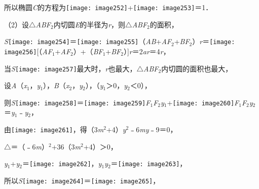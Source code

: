 \documentclass[a4paper,11pt,UTF8,twoside]{ctexart} %
\begin{document}
所以椭圆\textit{C}的方程为\texttt{[image: image252]}+\texttt{[image: image253]}＝1．

（2）设$\mathrm{\triangle}$\textit{ABF}${}_{2}$内切圆\textit{E}的半径为\textit{r}，则$\mathrm{\triangle}$\textit{ABF}${}_{2}$的面积，

\textit{S}\texttt{[image: image254]}＝\texttt{[image: image255]}（{\textbar}\textit{AB}{\textbar}+{\textbar}\textit{AF}${}_{2}${\textbar}+{\textbar}\textit{BF}${}_{2}${\textbar}）\textit{r}＝\texttt{[image: image256]}[（{\textbar}\textit{AF}${}_{1}${\textbar}+{\textbar}\textit{AF}${}_{2}${\textbar}）+（{\textbar}\textit{BF}${}_{1}${\textbar}+{\textbar}\textit{BF}${}_{2}${\textbar}）]\textit{r}＝2\textit{ar}＝4\textit{r}，

当\textit{S}\texttt{[image: image257]}最大时，\textit{r}也最大，$\mathrm{\triangle}$\textit{ABF}${}_{2}$内切圆的面积也最大，

设\textit{A}（\textit{x}${}_{1}$，\textit{y}${}_{1}$），\textit{B}（\textit{x}${}_{2}$，\textit{y}${}_{2}$），（\textit{y}${}_{1}$＞0，\textit{y}${}_{2}$＜0），

则\textit{S}\texttt{[image: image258]}＝\texttt{[image: image259]}{\textbar}\textit{F}${}_{1}$\textit{F}${}_{2}${\textbar}{\textbar}\textit{y}${}_{1}${\textbar}+\texttt{[image: image260]}{\textbar}\textit{F}${}_{1}$\textit{F}${}_{2}${\textbar}{\textbar}\textit{y}${}_{2}${\textbar}＝\textit{y}${}_{1}$﹣\textit{y}${}_{2}$，

由\texttt{[image: image261]}，得（3\textit{m}${}^{2}$+4）\textit{y}${}^{2}$﹣6\textit{my}﹣9＝0，

$\mathrm{\triangle}$＝（﹣6\textit{m}）${}^{2}$+36（3\textit{m}${}^{2}$+4）＞0，

\textit{y}${}_{1}$+\textit{y}${}_{2}$＝\texttt{[image: image262]}，\textit{y}${}_{1}$\textit{y}${}_{2}$＝\texttt{[image: image263]}，

所以\textit{S}\texttt{[image: image264]}＝\texttt{[image: image265]}，
\end{document}
